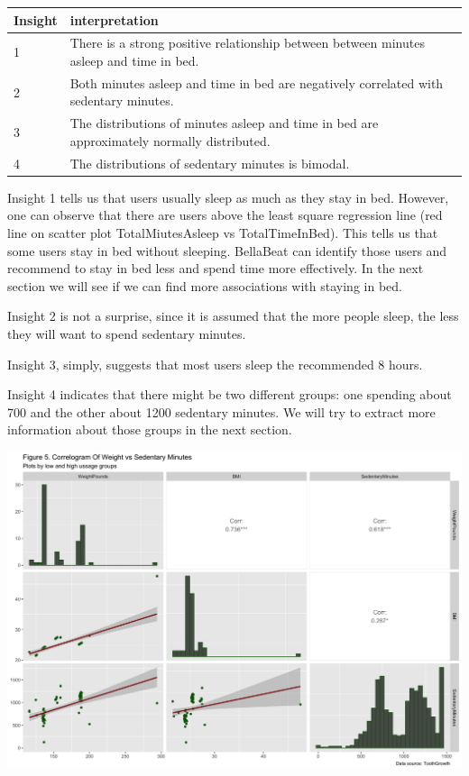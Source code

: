 \documentclass[
]{article}
\begin{document}
\begin{table}
\centering\begingroup\fontsize{14}{16}\selectfont

\begin{tabular}[t]{l|l}
\hline
Insight & interpretation\\
\hline
1 & There is a strong positive relationship between between minutes asleep and time in bed.\\
\hline
2 & Both minutes asleep and time in bed are negatively correlated with sedentary minutes.\\
\hline
3 & The distributions of minutes asleep and time in bed are approximately normally distributed.\\
\hline
4 & The distributions of sedentary minutes is bimodal.\\
\hline
\end{tabular}
\endgroup{}
\end{table}

Insight 1 tells us that users usually sleep as much as they stay in bed.
However, one can observe that there are users above the least square
regression line (red line on scatter plot TotalMiutesAsleep vs
TotalTimeInBed). This tells us that some users stay in bed without
sleeping. BellaBeat can identify those users and recommend to stay in
bed less and spend time more effectively. In the next section we will
see if we can find more associations with staying in bed.

Insight 2 is not a surprise, since it is assumed that the more people
sleep, the less they will want to spend sedentary minutes.

Insight 3, simply, suggests that most users sleep the recommended 8
hours.

Insight 4 indicates that there might be two different groups: one
spending about 700 and the other about 1200 sedentary minutes. We will
try to extract more information about those groups in the next section.

\includegraphics[width=0.9\linewidth]{./figs/correlogram2}
\end{document}
